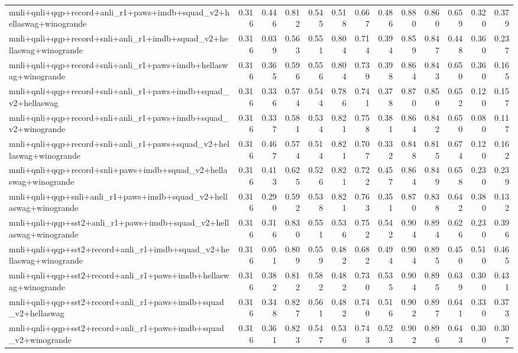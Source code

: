 \begin{table}[t]
\begin{tabular}{lrrrrrrrrrrrr}
    \addlinespace
    mnli+qnli+qqp+record+anli\_r1+paws+imdb+squad\_v2+hellaswag+winogrande & 0.316 & 0.446 & 0.812 & 0.545 & 0.518 & 0.667 & 0.486 & 0.880 & 0.860 & 0.659 & 0.320 & 0.379 \\
    mnli+qnli+qqp+record+snli+anli\_r1+imdb+squad\_v2+hellaswag+winogrande & 0.316 & 0.039 & 0.563 & 0.551 & 0.804 & 0.714 & 0.394 & 0.859 & 0.847 & 0.448 & 0.360 & 0.237 \\
    mnli+qnli+qqp+record+snli+anli\_r1+paws+imdb+hellaswag+winogrande & 0.316 & 0.365 & 0.596 & 0.556 & 0.804 & 0.739 & 0.398 & 0.864 & 0.843 & 0.650 & 0.360 & 0.165 \\
    mnli+qnli+qqp+record+snli+anli\_r1+paws+imdb+squad\_v2+hellaswag & 0.316 & 0.336 & 0.574 & 0.544 & 0.786 & 0.741 & 0.378 & 0.870 & 0.850 & 0.652 & 0.120 & 0.157 \\
    mnli+qnli+qqp+record+snli+anli\_r1+paws+imdb+squad\_v2+winogrande & 0.316 & 0.337 & 0.581 & 0.534 & 0.821 & 0.758 & 0.381 & 0.864 & 0.842 & 0.650 & 0.080 & 0.117 \\
    mnli+qnli+qqp+record+snli+anli\_r1+paws+squad\_v2+hellaswag+winogrande & 0.316 & 0.467 & 0.574 & 0.514 & 0.821 & 0.707 & 0.332 & 0.848 & 0.815 & 0.674 & 0.120 & 0.162 \\
    mnli+qnli+qqp+record+snli+paws+imdb+squad\_v2+hellaswag+winogrande & 0.316 & 0.413 & 0.625 & 0.526 & 0.821 & 0.722 & 0.457 & 0.864 & 0.849 & 0.658 & 0.230 & 0.239 \\
    mnli+qnli+qqp+snli+anli\_r1+paws+imdb+squad\_v2+hellaswag+winogrande & 0.316 & 0.290 & 0.592 & 0.538 & 0.821 & 0.763 & 0.351 & 0.870 & 0.838 & 0.642 & 0.380 & 0.132 \\
    mnli+qnli+qqp+sst2+anli\_r1+paws+imdb+squad\_v2+hellaswag+winogrande & 0.316 & 0.316 & 0.830 & 0.551 & 0.536 & 0.752 & 0.542 & 0.904 & 0.894 & 0.626 & 0.230 & 0.396 \\
    mnli+qnli+qqp+sst2+record+anli\_r1+imdb+squad\_v2+hellaswag+winogrande & 0.316 & 0.051 & 0.809 & 0.559 & 0.482 & 0.682 & 0.494 & 0.904 & 0.895 & 0.450 & 0.510 & 0.465 \\
    mnli+qnli+qqp+sst2+record+anli\_r1+paws+imdb+hellaswag+winogrande & 0.316 & 0.382 & 0.812 & 0.582 & 0.482 & 0.730 & 0.535 & 0.904 & 0.895 & 0.639 & 0.300 & 0.431 \\
    mnli+qnli+qqp+sst2+record+anli\_r1+paws+imdb+squad\_v2+hellaswag & 0.316 & 0.348 & 0.827 & 0.561 & 0.482 & 0.740 & 0.516 & 0.902 & 0.897 & 0.641 & 0.330 & 0.373 \\
    mnli+qnli+qqp+sst2+record+anli\_r1+paws+imdb+squad\_v2+winogrande & 0.316 & 0.361 & 0.823 & 0.547 & 0.536 & 0.743 & 0.523 & 0.902 & 0.896 & 0.643 & 0.300 & 0.307 \\

\end{tabular}
\end{table}
